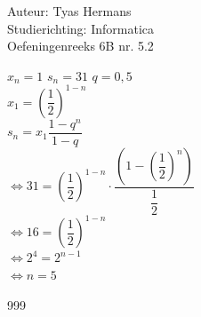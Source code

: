 \documentclass[a4paper]{article}
\begin{document}
  
\noindent \large Auteur: Tyas Hermans \\
\noindent \large Studierichting: Informatica\\
\noindent \large Oefeningenreeks 6B nr. 5.2\\

\medskip

\normalsize

$x_n = 1$ $s_n = 31$ $q=0,5$\\

$x_1 = \left(\dfrac{1}{2}\right)^{1-n}$\\

$s_n = x_1\dfrac{1-q^n}{1-q}$\\

$\Leftrightarrow 31 = \left(\dfrac{1}{2}\right)^{1-n}\cdot\dfrac{\left(1-\left(\dfrac{1}{2}\right)^n\right)}{\dfrac{1}{2}}$\\

$\Leftrightarrow 16 = \left(\dfrac{1}{2}\right)^{1-n}$\\

$\Leftrightarrow 2^4 = 2^{n-1}$\\

$\Leftrightarrow n = 5$\\



\begin{thebibliography}{999}
\end{thebibliography}
\end{document}
